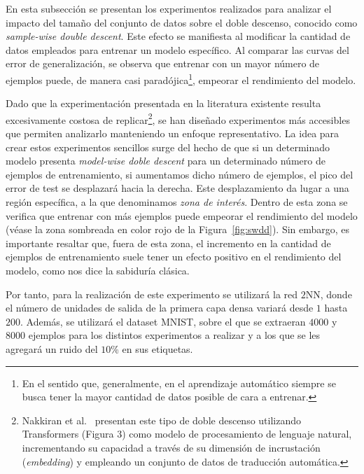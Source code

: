 En esta subsección se presentan los experimentos realizados para analizar el impacto del tamaño del conjunto de datos sobre el doble descenso, conocido como \textit{sample-wise double descent}. Este efecto se manifiesta al modificar la cantidad de datos empleados para entrenar un modelo específico. Al comparar las curvas del error de generalización, se observa que entrenar con un mayor número de ejemplos puede, de manera casi paradójica\footnote{En el sentido que, generalmente, en el aprendizaje automático siempre se busca tener la mayor cantidad de datos posible de cara a entrenar.}, empeorar el rendimiento del modelo.

Dado que la experimentación presentada en la literatura existente resulta excesivamente costosa de replicar\footnote{Nakkiran et al.~\cite{Nakkiran2019} presentan este tipo de doble descenso utilizando Transformers (Figura 3) como modelo de procesamiento de lenguaje natural, incrementando su capacidad a través de su dimensión de incrustación (\textit{embedding}) y empleando un conjunto de datos de traducción automática.}, se han diseñado experimentos más accesibles que permiten analizarlo manteniendo un enfoque representativo. La idea para crear estos experimentos sencillos surge del hecho de que si un determinado modelo presenta \textit{model-wise doble descent} para un determinado número de ejemplos de entrenamiento, si aumentamos dicho número de ejemplos, el pico del error de test se desplazará hacia la derecha. Este desplazamiento da lugar a una región específica, a la que denominamos \textit{zona de interés}. Dentro de esta zona se verifica que entrenar con más ejemplos puede empeorar el rendimiento del modelo (véase la zona sombreada en color rojo de la Figura~\ref{fig:swdd}). Sin embargo, es importante resaltar que, fuera de esta zona, el incremento en la cantidad de ejemplos de entrenamiento suele tener un efecto positivo en el rendimiento del modelo, como nos dice la sabiduría clásica.

Por tanto, para la realización de este experimento se utilizará la red $2$NN, donde el número de unidades de salida de la primera capa densa variará desde $1$ hasta $200$. Además, se utilizará el dataset MNIST, sobre el que se extraeran $4000$ y $8000$ ejemplos para los distintos experimentos a realizar y a los que se les agregará un ruido del $10$\% en sus etiquetas.

